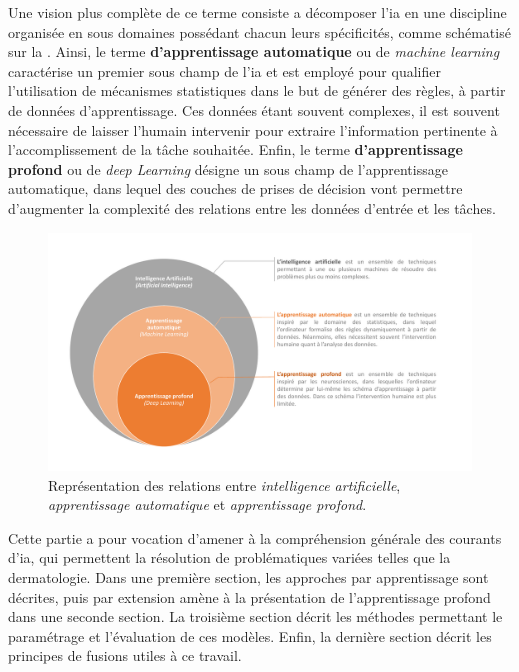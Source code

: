 Une vision plus complète de ce terme consiste a décomposer l'\gls{ia} en une discipline organisée en sous domaines possédant chacun leurs spécificités, comme schématisé sur la . Ainsi, le terme \textbf{d'apprentissage automatique} ou de \textit{machine learning} caractérise un premier sous champ de l'\gls{ia} et est employé pour qualifier l'utilisation de mécanismes statistiques dans le but de générer des règles, à partir de données d'apprentissage. Ces données étant souvent complexes, il est souvent nécessaire de laisser l'humain intervenir pour extraire l'information pertinente à l'accomplissement de la tâche souhaitée. Enfin, le terme \textbf{d'apprentissage profond} ou de \textit{deep Learning} désigne un sous champ de l'apprentissage automatique, dans lequel des couches de prises de décision vont permettre d'augmenter la complexité des relations entre les données d'entrée et les tâches.\par

\addtocounter{footnote}{1}

\begin{figure}[H]
    \centering
    \includegraphics[width=\linewidth]{contents/chapter_3/resources/scheme_overview_ia.pdf}
    \caption{Représentation des relations entre \textit{intelligence artificielle}, \textit{apprentissage automatique} et \textit{apprentissage profond}.}
    \label{fig:scheme_overview_ia}
\end{figure}\par

Cette partie a pour vocation d’amener à la compréhension générale des courants d’\gls{ia}, qui permettent la résolution de problématiques variées telles que la dermatologie. Dans une première section, les approches par apprentissage sont décrites, puis par extension amène à la présentation de l'apprentissage profond dans une seconde section. La troisième section décrit les méthodes permettant le paramétrage et l'évaluation de ces modèles. Enfin, la dernière section décrit les principes de fusions utiles à ce travail.\par

